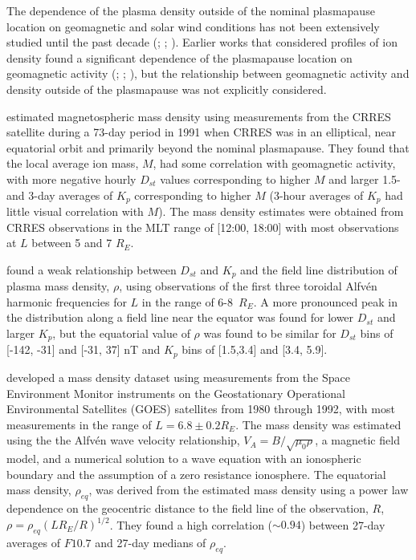 \documentclass[12pt]{article}
\begin{document}
The dependence of the plasma density outside of the nominal plasmapause location on geomagnetic and solar wind conditions has not been extensively studied until the past decade (\cite{Takahashi2006}; \cite{Takahashi2010}; \cite{Denton2016}). Earlier works that considered profiles of ion density found a significant dependence of the plasmapause location on geomagnetic activity (\cite{Chappell1970}; \cite{Maynard1977}; \cite{Carpenter1992}), but the relationship between geomagnetic activity and density outside of the plasmapause was not explicitly considered.

\cite{Takahashi2006} estimated magnetospheric mass density using measurements from the CRRES satellite during a 73-day period in 1991 when CRRES was in an elliptical, near equatorial orbit and primarily beyond the nominal plasmapause. They found that the local average ion mass, $M$, had some correlation with geomagnetic activity, with more negative hourly $D_{st}$ values corresponding to higher $M$ and larger 1.5- and 3-day averages of $K_p$ corresponding to higher $M$ (3-hour averages of $K_p$ had little visual correlation with $M$). The mass density estimates were obtained from CRRES observations in the MLT range of [12:00, 18:00] with most observations at $L$ between 5 and 7 $R_E$.

\cite{Denton2006} found a weak relationship between $D_{st}$ and $K_p$ and the field line distribution of plasma mass density, $\rho$, using observations of the first three toroidal Alfv\'en harmonic frequencies for $L$ in the range of 6-8~$R_E$.  A more pronounced peak in the distribution along a field line near the equator was found for lower $D_{st}$ and larger $K_p$, but the equatorial value of $\rho$ was found to be similar for $D_{st}$ bins of [-142, -31] and [-31, 37] nT and $K_p$ bins of [1.5,3.4] and [3.4, 5.9].

\cite{Takahashi2010} developed a mass density dataset using measurements from the Space Environment Monitor instruments on the Geostationary Operational Environmental Satellites (GOES) satellites from 1980 through 1992, with most measurements in the range of $L=6.8\pm0.2 R_E$. The mass density was estimated using the the Alfv\'en wave velocity relationship, $V_A=B/\sqrt{\mu_0\rho}$, a magnetic field model, and a numerical solution to a wave equation with an ionospheric boundary and the assumption of a zero resistance ionosphere.  The equatorial mass density, $\rho_{eq}$, was derived from the estimated mass density using a power law dependence on the geocentric distance to the field line of the observation, $R$, $\rho=\rho_{eq}(LR_E/R)^{1/2}$.  They found a high correlation ($\sim 0.94$) between 27-day averages of $F10.7$ and 27-day medians of $\rho_{eq}$.
\end{document}
